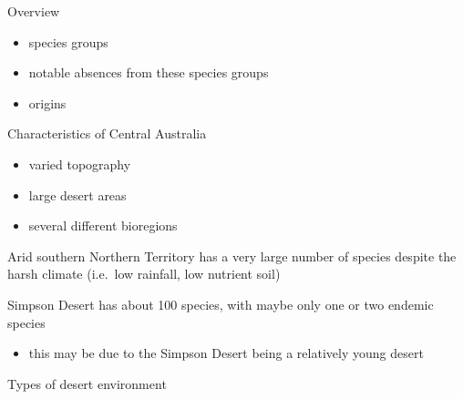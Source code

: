 \documentclass[
]{article}
\providecommand{\tightlist}{%
  \setlength{\itemsep}{0pt}\setlength{\parskip}{0pt}}
\begin{document}
Overview

\begin{itemize}
\tightlist
\item
  species groups
\item
  notable absences from these species groups
\item
  origins
\end{itemize}

Characteristics of Central Australia

\begin{itemize}
\tightlist
\item
  varied topography
\item
  large desert areas
\item
  several different bioregions
\end{itemize}

Arid southern Northern Territory has a very large number of species
despite the harsh climate (i.e.~low rainfall, low nutrient soil)

Simpson Desert has about 100 species, with maybe only one or two endemic
species

\begin{itemize}
\tightlist
\item
  this may be due to the Simpson Desert being a relatively young desert
\end{itemize}

Types of desert environment
\end{document}
